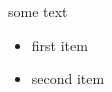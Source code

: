 \documentclass{beamer}
\begin{document}
 
    \begin{frame} 
        some text 


        \begin{itemize}[<+->] 
            \item first item 
            \item second item 
        \end{itemize} 

    \end{frame} 
\end{document}
